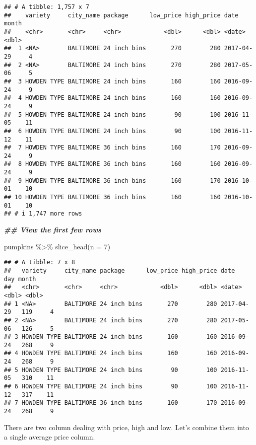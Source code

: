 \documentclass[
]{article}
\newenvironment{Shaded}{\begin{snugshade}}{\end{snugshade}}
\newcommand{\AttributeTok}[1]{\textcolor[rgb]{0.77,0.63,0.00}{#1}}
\newcommand{\DecValTok}[1]{\textcolor[rgb]{0.00,0.00,0.81}{#1}}
\newcommand{\DocumentationTok}[1]{\textcolor[rgb]{0.56,0.35,0.01}{\textbf{\textit{#1}}}}
\newcommand{\FunctionTok}[1]{\textcolor[rgb]{0.00,0.00,0.00}{#1}}
\newcommand{\NormalTok}[1]{#1}
\newcommand{\SpecialCharTok}[1]{\textcolor[rgb]{0.00,0.00,0.00}{#1}}
\begin{document}
\begin{verbatim}
## # A tibble: 1,757 x 7
##    variety     city_name package      low_price high_price date       month
##    <chr>       <chr>     <chr>            <dbl>      <dbl> <date>     <dbl>
##  1 <NA>        BALTIMORE 24 inch bins       270        280 2017-04-29     4
##  2 <NA>        BALTIMORE 24 inch bins       270        280 2017-05-06     5
##  3 HOWDEN TYPE BALTIMORE 24 inch bins       160        160 2016-09-24     9
##  4 HOWDEN TYPE BALTIMORE 24 inch bins       160        160 2016-09-24     9
##  5 HOWDEN TYPE BALTIMORE 24 inch bins        90        100 2016-11-05    11
##  6 HOWDEN TYPE BALTIMORE 24 inch bins        90        100 2016-11-12    11
##  7 HOWDEN TYPE BALTIMORE 36 inch bins       160        170 2016-09-24     9
##  8 HOWDEN TYPE BALTIMORE 36 inch bins       160        160 2016-09-24     9
##  9 HOWDEN TYPE BALTIMORE 36 inch bins       160        170 2016-10-01    10
## 10 HOWDEN TYPE BALTIMORE 36 inch bins       160        160 2016-10-01    10
## # i 1,747 more rows
\end{verbatim}

\begin{Shaded}
\begin{Highlighting}[]
\DocumentationTok{\#\# View the first few rows}

\NormalTok{pumpkins }\SpecialCharTok{\%\textgreater{}\%} \FunctionTok{slice\_head}\NormalTok{(}\AttributeTok{n =} \DecValTok{7}\NormalTok{)}
\end{Highlighting}
\end{Shaded}

\begin{verbatim}
## # A tibble: 7 x 8
##   variety     city_name package      low_price high_price date         day month
##   <chr>       <chr>     <chr>            <dbl>      <dbl> <date>     <dbl> <dbl>
## 1 <NA>        BALTIMORE 24 inch bins       270        280 2017-04-29   119     4
## 2 <NA>        BALTIMORE 24 inch bins       270        280 2017-05-06   126     5
## 3 HOWDEN TYPE BALTIMORE 24 inch bins       160        160 2016-09-24   268     9
## 4 HOWDEN TYPE BALTIMORE 24 inch bins       160        160 2016-09-24   268     9
## 5 HOWDEN TYPE BALTIMORE 24 inch bins        90        100 2016-11-05   310    11
## 6 HOWDEN TYPE BALTIMORE 24 inch bins        90        100 2016-11-12   317    11
## 7 HOWDEN TYPE BALTIMORE 36 inch bins       160        170 2016-09-24   268     9
\end{verbatim}

There are two column dealing with price, high and low. Let's combine
them into a single average price column.
\end{document}
